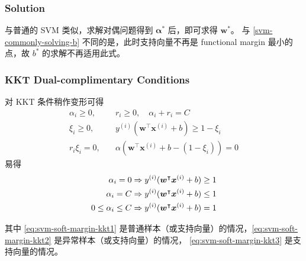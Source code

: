 		\subsubsection{Solution}
		与普通的 SVM 类似，求解对偶问题得到 $ \bm{\alpha}^* $ 后，即可求得 $ \bm{w}^* $。
		与 \eqref{svm-commonly-solving-b} 不同的是，此时支持向量不再是 functional margin 最小的点，故 $ b^* $ 的求解不再适用此式。
		
		\subsubsection{KKT Dual-complimentary Conditions}
		对 KKT 条件稍作变形可得
		\begin{align*}
			\alpha_i \geq 0, \quad & r_i \geq 0, \quad \alpha_i + r_i = C \\
			\xi_i \geq 0, \quad & y^{(i)} ( \bm{w}^\intercal \bm{x}^{(i)} + b ) \geq 1 - \xi_i \\
			r_i \xi_i = 0, \quad & \alpha \left( \bm{w}^\intercal \bm{x}^{(i)} + b - (1-\xi_i) \right) = 0
		\end{align*}
		易得
		\begin{align}
			\alpha_i = 0 & \Rightarrow y^{(i)} ( \bm{w}^\intercal \bm{x}^{(i)} + b ) \geq 1 \label{eq:svm-soft-margin-kkt1} \\ 
			\alpha_i = C & \Rightarrow y^{(i)} ( \bm{w}^\intercal \bm{x}^{(i)} + b ) \leq 1 \label{eq:svm-soft-margin-kkt2} \\
			0 \leq \alpha_i \leq C & \Rightarrow y^{(i)} ( \bm{w}^\intercal \bm{x}^{(i)} + b ) = 1\label{eq:svm-soft-margin-kkt3}		
		\end{align}
		
		其中 \eqref{eq:svm-soft-margin-kkt1} 是普通样本（或支持向量）的情况，\eqref{eq:svm-soft-margin-kkt2} 是异常样本（或支持向量）的情况，
		\eqref{eq:svm-soft-margin-kkt3} 是支持向量的情况。